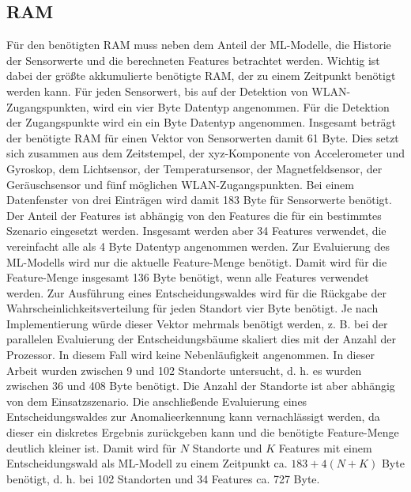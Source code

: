 \subsection{RAM}
Für den benötigten RAM muss neben dem Anteil der ML-Modelle, die Historie der Sensorwerte und die berechneten Features betrachtet werden.
Wichtig ist dabei der größte akkumulierte benötigte RAM, der zu einem Zeitpunkt benötigt werden kann.
\newline
\newline
Für jeden Sensorwert, bis auf der Detektion von WLAN-Zugangspunkten, wird ein vier Byte Datentyp angenommen.
Für die Detektion der Zugangspunkte wird ein ein Byte Datentyp angenommen.
Insgesamt beträgt der benötigte RAM für einen Vektor von Sensorwerten damit 61 Byte.
Dies setzt sich zusammen aus dem Zeitstempel, der xyz-Komponente von Accelerometer und Gyroskop, dem Lichtsensor,
der Temperatursensor, der Magnetfeldsensor, der Geräuschsensor und fünf möglichen WLAN-Zugangspunkten.
Bei einem Datenfenster von drei Einträgen wird damit 183 Byte für Sensorwerte benötigt.
\newline
\newline
Der Anteil der Features ist abhängig von den Features die für ein bestimmtes Szenario eingesetzt werden.
Insgesamt werden aber 34 Features verwendet, die vereinfacht alle als 4 Byte Datentyp angenommen werden.
Zur Evaluierung des ML-Modells wird nur die aktuelle Feature-Menge benötigt.
Damit wird für die Feature-Menge insgesamt 136 Byte benötigt, wenn alle Features verwendet werden.
\newline
\newline
Zur Ausführung eines Entscheidungswaldes wird für die Rückgabe der Wahrscheinlichkeitsverteilung für jeden Standort vier Byte benötigt.
Je nach Implementierung würde dieser Vektor mehrmals benötigt werden, z. B. bei der parallelen Evaluierung der Entscheidungsbäume skaliert dies mit der Anzahl der Prozessor.
In diesem Fall wird keine Nebenläufigkeit angenommen.
In dieser Arbeit wurden zwischen 9 und 102 Standorte untersucht, d. h. es wurden zwischen 36 und 408 Byte benötigt.
Die Anzahl der Standorte ist aber abhängig von dem Einsatzszenario.
Die anschließende Evaluierung eines Entscheidungswaldes zur Anomalieerkennung kann vernachlässigt werden,
da dieser ein diskretes Ergebnis zurückgeben kann und die benötigte Feature-Menge deutlich kleiner ist.
Damit wird für $N$ Standorte und $K$ Features mit einem Entscheidungswald als ML-Modell zu einem Zeitpunkt
ca. $183 + 4(N + K)$ Byte benötigt, d. h. bei 102 Standorten und 34 Features ca. 727 Byte.
